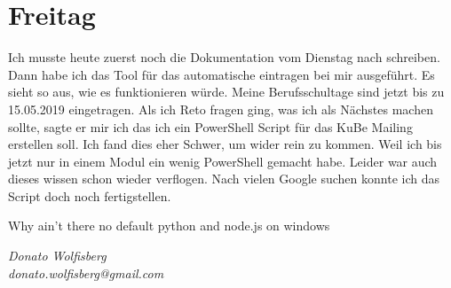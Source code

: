 \documentclass[12pt, titlepage]{article}
\begin{document}
  \section{Freitag}
  Ich musste heute zuerst noch die Dokumentation vom Dienstag nach schreiben.
Dann habe ich das Tool für das automatische eintragen bei mir ausgeführt.
Es sieht so aus, wie es funktionieren würde. Meine Berufsschultage sind
jetzt bis zu 15.05.2019 eingetragen. Als ich Reto fragen ging, was ich als
Nächstes machen sollte, sagte er mir ich das ich ein PowerShell Script
für das KuBe Mailing erstellen soll. Ich fand dies eher Schwer, um wider rein zu kommen. Weil ich bis jetzt nur in einem Modul
ein wenig PowerShell gemacht habe. Leider war auch dieses wissen
schon wieder verflogen. Nach vielen Google suchen konnte ich das Script
doch noch fertigstellen.

  \epigraph{Why ain't there no default python and node.js on windows}
  {\textit{Donato Wolfisberg \\ donato.wolfisberg@gmail.com}}
\end{document}
